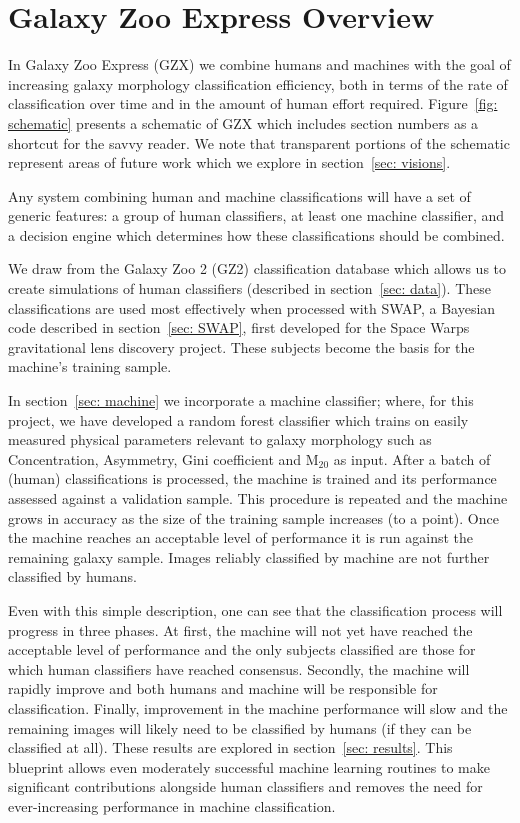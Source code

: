 \documentclass[twocolumn]{aastex6}
\begin{document}
\section{Galaxy Zoo Express Overview}
In Galaxy Zoo Express (GZX) we combine humans and machines with the goal of 
increasing galaxy morphology classification efficiency, both in terms of the rate 
of classification over time and in the amount of human effort required. 
Figure~\ref{fig: schematic} presents a schematic of GZX which includes section 
numbers as a shortcut for the savvy reader. We note that transparent portions
 of the schematic represent areas of future work which we explore in section~\ref{sec: visions}. 

Any system combining human and machine classifications will have a set of generic 
features: a group of human classifiers, at least one machine classifier, and a 
decision engine which determines how these classifications should be combined.


We draw from the Galaxy Zoo 2 (GZ2) classification database which allows us to 
 create simulations of human classifiers (described in section~\ref{sec: data}).
These classifications are used most effectively when processed with SWAP, 
a Bayesian code described in  section~\ref{sec: SWAP}, first developed for the 
Space Warps gravitational lens discovery project. 
These subjects become the basis for the machine's training sample. 

In section~\ref{sec: machine} we incorporate a machine classifier; where, for this
project, we have developed a random forest classifier which trains on easily measured 
physical parameters relevant to galaxy morphology such as Concentration, Asymmetry, 
Gini coefficient and M$_{20}$ as input. 
After a batch of (human) classifications is processed,  the machine is trained and 
its performance assessed against a validation sample. This procedure is repeated and 
the machine grows in accuracy as the size of the training sample increases (to a point). 
Once the machine reaches an acceptable level of performance it is run against the 
remaining galaxy sample. Images reliably classified by machine are not further classified by humans.

Even with this simple description, one can see that the classification process 
will progress in three phases. At first, the machine will not yet have reached the 
acceptable level of performance and the only subjects classified
 are those for which human classifiers have reached consensus. 
Secondly, the machine will rapidly improve and both humans and machine will be 
responsible for classification. Finally, improvement in the machine performance 
will slow and the remaining images will likely need to be classified by humans (if they can be 
classified at all). These results are explored in section~\ref{sec: results}. 
This blueprint allows even moderately successful machine learning 
routines to make significant contributions alongside human classifiers and 
removes the need for ever-increasing performance in machine classification.
\end{document}
